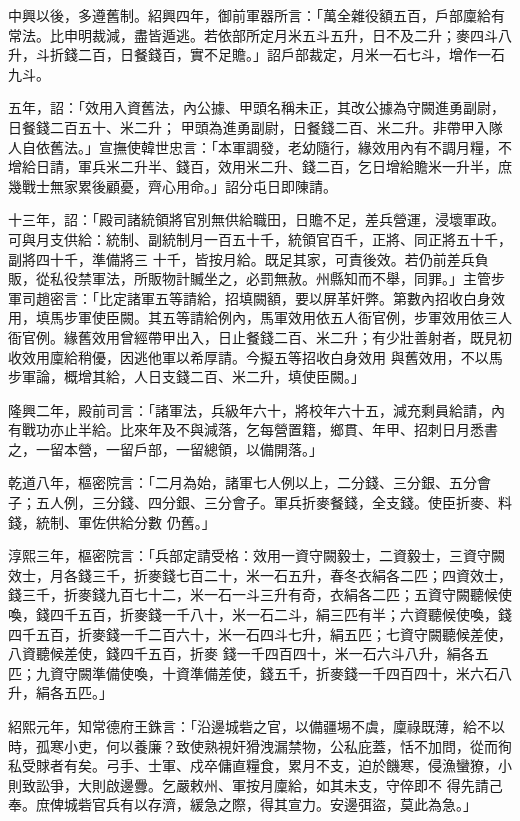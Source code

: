 \begin{pinyinscope}
 中興以後，多遵舊制。紹興四年，御前軍器所言：「萬全雜役額五百，戶部廩給有常法。比申明裁減，盡皆遁逃。若依部所定月米五斗五升，日不及二升；麥四斗八升，斗折錢二百，日餐錢百，實不足贍。」詔戶部裁定，月米一石七斗，增作一石九斗。



 五年，詔：「效用入資舊法，內公據、甲頭名稱未正，其改公據為守闕進勇副尉，日餐錢二百五十、米二升；
 甲頭為進勇副尉，日餐錢二百、米二升。非帶甲入隊人自依舊法。」宣撫使韓世忠言：「本軍調發，老幼隨行，緣效用內有不調月糧，不增給日請，軍兵米二升半、錢百，效用米二升、錢二百，乞日增給贍米一升半，庶幾戰士無家累後顧憂，齊心用命。」詔分屯日即陳請。



 十三年，詔：「殿司諸統領將官別無供給職田，日贍不足，差兵營運，浸壞軍政。可與月支供給：統制、副統制月一百五十千，統領官百千，正將、同正將五十千，副將四十千，準備將三
 十千，皆按月給。既足其家，可責後效。若仍前差兵負販，從私役禁軍法，所販物計贓坐之，必罰無赦。州縣知而不舉，同罪。」主管步軍司趙密言：「比定諸軍五等請給，招填闕額，要以屏革奸弊。第數內招收白身效用，填馬步軍使臣闕。其五等請給例內，馬軍效用依五人衙官例，步軍效用依三人衙官例。緣舊效用曾經帶甲出入，日止餐錢二百、米二升；有少壯善射者，既見初收效用廩給稍優，因逃他軍以希厚請。今擬五等招收白身效用
 與舊效用，不以馬步軍論，概增其給，人日支錢二百、米二升，填使臣闕。」



 隆興二年，殿前司言：「諸軍法，兵級年六十，將校年六十五，減充剩員給請，內有戰功亦止半給。比來年及不與減落，乞每營置籍，鄉貫、年甲、招刺日月悉書之，一留本營，一留戶部，一留總領，以備開落。」



 乾道八年，樞密院言：「二月為始，諸軍七人例以上，二分錢、三分銀、五分會子；五人例，三分錢、四分銀、三分會子。軍兵折麥餐錢，全支錢。使臣折麥、料錢，統制、軍佐供給分數
 仍舊。」



 淳熙三年，樞密院言：「兵部定請受格：效用一資守闕毅士，二資毅士，三資守闕效士，月各錢三千，折麥錢七百二十，米一石五升，春冬衣絹各二匹；四資效士，錢三千，折麥錢九百七十二，米一石一斗三升有奇，衣絹各二匹；五資守闕聽候使喚，錢四千五百，折麥錢一千八十，米一石二斗，絹三匹有半；六資聽候使喚，錢四千五百，折麥錢一千二百六十，米一石四斗七升，絹五匹；七資守闕聽候差使，八資聽候差使，錢四千五百，折麥
 錢一千四百四十，米一石六斗八升，絹各五匹；九資守闕準備使喚，十資準備差使，錢五千，折麥錢一千四百四十，米六石八升，絹各五匹。」



 紹熙元年，知常德府王銖言：「沿邊城砦之官，以備疆埸不虞，廩祿既薄，給不以時，孤寒小吏，何以養廉？致使熟視奸猾洩漏禁物，公私庇蓋，恬不加問，從而徇私受賕者有矣。弓手、士軍、戍卒傭直糧食，累月不支，迫於饑寒，侵漁蠻獠，小則致訟爭，大則啟邊釁。乞嚴敕州、軍按月廩給，如其未支，守倅即不
 得先請己奉。庶俾城砦官兵有以存濟，緩急之際，得其宣力。安邊弭盜，莫此為急。」




\end{pinyinscope}
